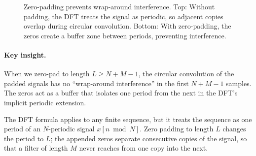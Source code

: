 \begin{notechapter}
\begin{figure}[H]
{%
}
\caption{Zero-padding prevents wrap-around interference. Top:
         Without padding, the DFT treats the signal as periodic, so
         adjacent copies overlap during circular convolution.
         Bottom: With zero-padding, the zeros create a buffer
         zone between periods, preventing interference.}
\end{figure}

\paragraph{Key insight.} When we zero-pad to length $L \geq N+M-1$, the circular convolution
of the padded signals has no ``wrap-around interference'' in the first $N+M-1$ samples.
The zeros act as a buffer that isolates one period from the next in the DFT's implicit
periodic extension.

\begin{remark}
The DFT formula applies to any finite sequence, but it treats the sequence as one period of an $N$-periodic signal $x[n\bmod N]$. Zero padding to length $L$ changes the period to $L$; the appended zeros separate consecutive copies of the signal, so that a filter of length $M$ never reaches from one copy into the next.
\end{remark}


\end{notechapter}
